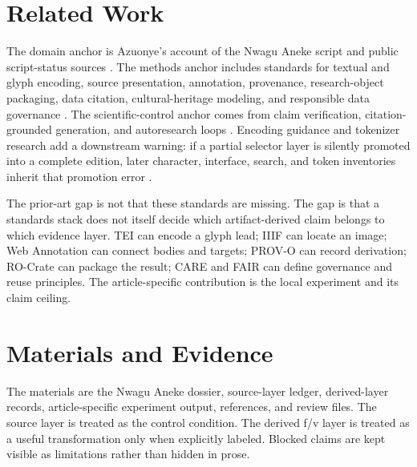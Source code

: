 \documentclass[sigconf,nonacm]{acmart}
\begin{document}
\section{Related Work}
The domain anchor is Azuonye's account of the Nwagu Aneke script and public
script-status sources \cite{azuonye1992,omniglotNwagu,unicodeAfricanScripts2023,scriptSourceNwagu,sirisNwaguProposal}.
The methods anchor includes standards for textual and glyph encoding, source
presentation, annotation, provenance, research-object packaging, data citation,
cultural-heritage modeling, and responsible data governance \cite{azuonye1992,omniglotNwagu,unicodeAfricanScripts2023,scriptSourceNwagu,sirisNwaguProposal,teiP5Glyphs,iiifPresentation3,w3cAnnotationModel,w3cAnnotationVocab,w3cProvO,rocrate12,cidocCrm,datacite45,wilkinson2016fair,carroll2020care,wadden2020scifact,gao2023alce,karpathyAutoresearch,acmSubmissions,arxivSubmitTex}.
The scientific-control anchor comes from claim verification, citation-grounded
generation, and autoresearch loops \cite{wadden2020scifact,gao2023alce,karpathyAutoresearch}.
Encoding guidance and tokenizer research add a downstream warning: if a partial
selector layer is silently promoted into a complete edition, later character,
interface, search, and token inventories inherit that promotion error
\cite{seiProposalTips,sennrich2016bpe,kudo2018sentencepiece,bostrom2020bytepair,rust2021tokenization}.

The prior-art gap is not that these standards are missing. The gap is that a
standards stack does not itself decide which artifact-derived claim belongs to
which evidence layer. TEI can encode a glyph lead; IIIF can locate an image;
Web Annotation can connect bodies and targets; PROV-O can record derivation;
RO-Crate can package the result; CARE and FAIR can define governance and reuse
principles. The article-specific contribution is the local experiment and its
claim ceiling.

\section{Materials and Evidence}
The materials are the Nwagu Aneke dossier, source-layer ledger, derived-layer
records, article-specific experiment output, references, and review files.
The source layer is treated as the control condition. The derived f/v layer is
treated as a useful transformation only when explicitly labeled. Blocked claims
are kept visible as limitations rather than hidden in prose.
\end{document}
